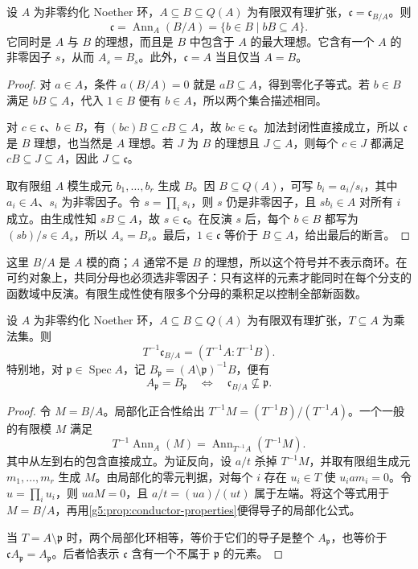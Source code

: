 \begin{proposition}\label{g5:prop:conductor-properties}
	设 \(A\) 为非零约化 Noether 环，\(A\subseteq B\subseteq Q(A)\) 为有限双有理扩张，\(\mathfrak c=\mathfrak c_{B/A}\)。则
	\[
	\mathfrak c=\operatorname{Ann}_A(B/A)
	=\{b\in B\mid bB\subseteq A\}.
	\]
	它同时是 \(A\) 与 \(B\) 的理想，而且是 \(B\) 中包含于 \(A\) 的最大理想。它含有一个 \(A\) 的非零因子 \(s\)，从而 \(A_s=B_s\)。此外，\(\mathfrak c=A\) 当且仅当 \(A=B\)。
\end{proposition}
\begin{proof}
	对 \(a\in A\)，条件 \(a(B/A)=0\) 就是 \(aB\subseteq A\)，得到零化子等式。若 \(b\in B\) 满足 \(bB\subseteq A\)，代入 \(1\in B\) 便有 \(b\in A\)，所以两个集合描述相同。

	对 \(c\in\mathfrak c\)、\(b\in B\)，有 \((bc)B\subseteq cB\subseteq A\)，故 \(bc\in\mathfrak c\)。加法封闭性直接成立，所以 \(\mathfrak c\) 是 \(B\) 理想，也当然是 \(A\) 理想。若 \(J\) 为 \(B\) 的理想且 \(J\subseteq A\)，则每个 \(c\in J\) 都满足 \(cB\subseteq J\subseteq A\)，因此 \(J\subseteq\mathfrak c\)。

	取有限组 \(A\) 模生成元 \(b_1,\ldots,b_r\) 生成 \(B\)。因 \(B\subseteq Q(A)\)，可写 \(b_i=a_i/s_i\)，其中 \(a_i\in A\)、\(s_i\) 为非零因子。令 \(s=\prod_i s_i\)，则 \(s\) 仍是非零因子，且 \(sb_i\in A\) 对所有 \(i\) 成立。由生成性知 \(sB\subseteq A\)，故 \(s\in\mathfrak c\)。在反演 \(s\) 后，每个 \(b\in B\) 都写为 \((sb)/s\in A_s\)，所以 \(A_s=B_s\)。最后，\(1\in\mathfrak c\) 等价于 \(B\subseteq A\)，给出最后的断言。
\end{proof}

这里 \(B/A\) 是 \(A\) 模的商；\(A\) 通常不是 \(B\) 的理想，所以这个符号并不表示商环。在可约对象上，共同分母也必须选非零因子：只有这样的元素才能同时在每个分支的函数域中反演。有限生成性使有限多个分母的乘积足以控制全部新函数。

\begin{proposition}\label{g5:prop:conductor-localization}
	设 \(A\) 为非零约化 Noether 环，\(A\subseteq B\subseteq Q(A)\) 为有限双有理扩张，\(T\subseteq A\) 为乘法集。则
	\[
	T^{-1}\mathfrak c_{B/A}
	=(T^{-1}A:T^{-1}B).
	\]
	特别地，对 \(\mathfrak p\in\operatorname{Spec}A\)，记
	\(B_{\mathfrak p}=(A\setminus\mathfrak p)^{-1}B\)，便有
	\[
	A_{\mathfrak p}=B_{\mathfrak p}
	\quad\Longleftrightarrow\quad
	\mathfrak c_{B/A}\not\subseteq\mathfrak p.
	\]
\end{proposition}
\begin{proof}
	令 \(M=B/A\)。局部化正合性给出
	\(T^{-1}M=(T^{-1}B)/(T^{-1}A)\)。一个一般的有限模 \(M\) 满足
	\[
	T^{-1}\operatorname{Ann}_A(M)
	=\operatorname{Ann}_{T^{-1}A}(T^{-1}M).
	\]
	其中从左到右的包含直接成立。为证反向，设 \(a/t\) 杀掉 \(T^{-1}M\)，并取有限组生成元 \(m_1,\ldots,m_r\) 生成 \(M\)。由局部化的零元判据，对每个 \(i\) 存在 \(u_i\in T\) 使 \(u_i a m_i=0\)。令 \(u=\prod_i u_i\)，则 \(uaM=0\)，且 \(a/t=(ua)/(ut)\) 属于左端。将这个等式用于 \(M=B/A\)，再用\cref{g5:prop:conductor-properties}便得导子的局部化公式。

	当 \(T=A\setminus\mathfrak p\) 时，两个局部化环相等，等价于它们的导子是整个 \(A_{\mathfrak p}\)，也等价于 \(\mathfrak c A_{\mathfrak p}=A_{\mathfrak p}\)。后者恰表示 \(\mathfrak c\) 含有一个不属于 \(\mathfrak p\) 的元素。
\end{proof}

